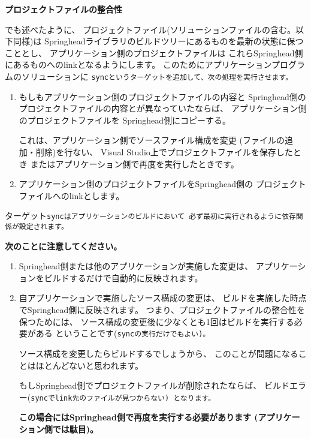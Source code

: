 \bigskip
\noindent
\bf{プロジェクトファイルの整合性}
\begin{narrow}[20pt]
	でも述べたように、
	プロジェクトファイル(ソリューションファイルの含む。以下同様)は
	Springheadライブラリのビルドツリーにあるものを最新の状態に保つこととし、
	アプリケーション側のプロジェクトファイルは
	これらSpringhead側にあるものへのlinkとなるようにします。
	このためにアプリケーションプログラムのソリューションに
	\tt{sync}というターゲットを追加して、次の処理を実行させます。
	\begin{enumerate}
	  \item	もしもアプリケーション側のプロジェクトファイルの内容と
		Springhead側のプロジェクトファイルの内容とが異なっていたならば、
		アプリケーション側のプロジェクトファイルを
		Springhead側にコピーする。
		\begin{narrow}[s][15pt]
		これは、アプリケーション側でソースファイル構成を変更
		(ファイルの追加・削除)を行ない、
		Visual Studio上でプロジェクトファイルを保存したとき
		またはアプリケーション側で再度\cmake を実行したときです。
		\end{narrow}

	  \item	アプリケーション側のプロジェクトファイルをSpringhead側の
		プロジェクトファイルへのlinkとします。
	\end{enumerate}
	ターゲット\tt{sync}はアプリケーションのビルドにおいて
	必ず最初に実行されるように依存関係が設定されます。
\end{narrow}	
\medskip
\begin{narrow}[20pt]
	\thinrule{\linewidth}
	{\bf{次のことに注意してください。}}

	\medskip
	\begin{enumerate}
	  \item	Springhead側または他のアプリケーションが実施した変更は、
		アプリケーションをビルドするだけで自動的に反映されます。

	  \item	自アプリケーションで実施したソース構成の変更は、
		ビルドを実施した時点でSpringhead側に反映されます。
		つまり、プロジェクトファイルの整合性を保つためには、
		ソース構成の変更後に少なくとも1回はビルドを実行する必要がある
		ということです(\tt{sync}の実行だけでもよい)。
		\begin{narrow}[s][15pt]
		ソース構成を変更したらビルドするでしょうから、
		このことが問題になることはほとんどないと思われます。

		もしSpringhead側でプロジェクトファイルが削除されたならば、
		ビルドエラー(\tt{sync}でlink先のファイルが見つからない)
		となります。
		
		{\bf{この場合にはSpringhead側で再度\cmake を実行する必要があります
		(アプリケーション側では駄目)。}}
		\end{narrow}
	\end{enumerate}

	\thinrule{\linewidth}
\end{narrow}	

